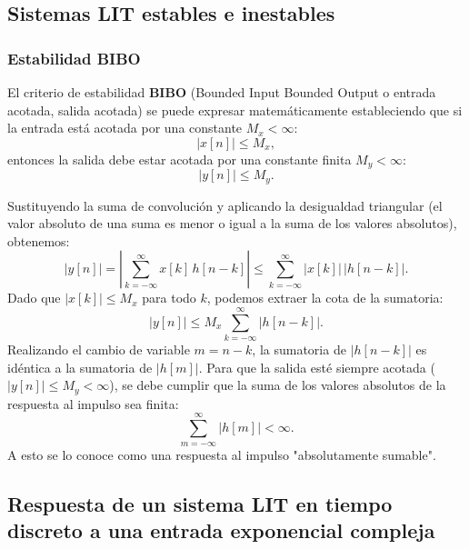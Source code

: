 \subsection{Sistemas LIT estables e inestables}

\subsubsection{Estabilidad BIBO}

El criterio de estabilidad \textbf{BIBO} (Bounded Input Bounded Output o entrada acotada, salida acotada) se puede expresar matemáticamente estableciendo que si la entrada está acotada por una constante $M_x < \infty$:
\begin{equation}
	|x[n]| \leq M_{x},
\end{equation}
entonces la salida debe estar acotada por una constante finita $M_y < \infty$:
\begin{equation}
	|y[n]| \leq M_{y}.
\end{equation}

Sustituyendo la suma de convolución y aplicando la desigualdad triangular (el valor absoluto de una suma es menor o igual a la suma de los valores absolutos), obtenemos:
\begin{equation}
	|y[n]| = \left| \sum_{k=-\infty}^{\infty} x[k] \, h[n-k] \right| \leq \sum_{k=-\infty}^{\infty} |x[k]| \, |h[n-k]|.
\end{equation}
Dado que $|x[k]| \leq M_x$ para todo $k$, podemos extraer la cota de la sumatoria:
\begin{equation}
	|y[n]| \leq M_{x} \sum_{k=-\infty}^{\infty} |h[n-k]|.
\end{equation}
Realizando el cambio de variable $m = n-k$, la sumatoria de $|h[n-k]|$ es idéntica a la sumatoria de $|h[m]|$. Para que la salida esté siempre acotada ($|y[n]| \leq M_{y} < \infty$), se debe cumplir que la suma de los valores absolutos de la respuesta al impulso sea finita:
\begin{equation}
	\sum_{m=-\infty}^{\infty} |h[m]| < \infty.
\end{equation}
A esto se lo conoce como una respuesta al impulso "absolutamente sumable".

\subsection{Respuesta de un sistema LIT en tiempo discreto a una entrada exponencial compleja}

